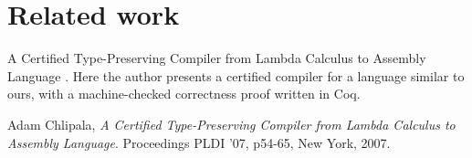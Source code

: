\documentclass[paper=a4, fontsize=11pt]{scrartcl} %
\numberwithin{equation}{section} %
\numberwithin{figure}{section} %
\numberwithin{table}{section} %
\begin{document}
\section{Related work} %
A Certified Type-Preserving Compiler from Lambda Calculus to
Assembly Language \cite{Chlipala}. Here the author presents a certified compiler for a language similar to ours, with a machine-checked correctness proof written in Coq.

\begin{thebibliography}{9}
	Adam Chlipala,
  	\emph{A Certified Type-Preserving Compiler from Lambda Calculus to
Assembly Language}.
  	Proceedings PLDI '07, p54-65, New York, 2007.
	
\end{thebibliography}
\end{document}
